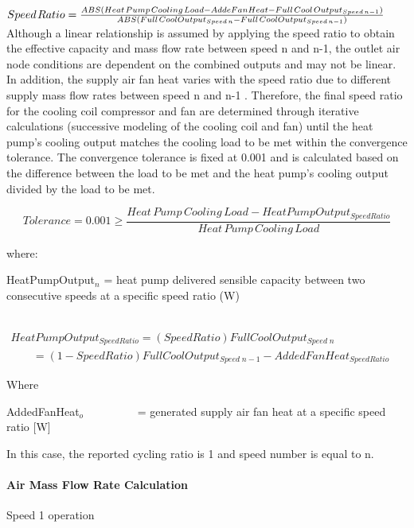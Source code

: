\(Speed{\kern 1pt} Ratio = \frac{{ABS(Heat{\kern 1pt} Pump{\kern 1pt} Cooling{\kern 1pt} Load - AddeFanHeat - Full{\kern 1pt} Cool{\kern 1pt} Outpu{t_{Speed{\kern 1pt} n - 1}})}}{{ABS(Full{\kern 1pt} CoolOutpu{t_{Speed{\kern 1pt} n}} - Full{\kern 1pt} CoolOutpu{t_{Speed{\kern 1pt} n - 1}})}}\) Although a linear relationship is assumed by applying the speed ratio to obtain the effective capacity and mass flow rate between speed n and n-1, the outlet air node conditions are dependent on the combined outputs and may not be linear. In addition, the supply air fan heat varies with the speed ratio due to different supply mass flow rates between speed n and n-1 . Therefore, the final speed ratio for the cooling coil compressor and fan are determined through iterative calculations (successive modeling of the cooling coil and fan) until the heat pump's cooling output matches the cooling load to be met within the convergence tolerance. The convergence tolerance is fixed at 0.001 and is calculated based on the difference between the load to be met and the heat pump's cooling output divided by the load to be met.

\begin{equation}
Tolerance = 0.001 \ge \frac{{Heat\,Pump\,Cooling\,Load - HeatPumpOutpu{t_{SpeedRatio}}}}{{Heat\,Pump\,Cooling\,Load}}
\end{equation}

where:

HeatPumpOutput\(_{n}\) = heat pump delivered sensible capacity between two consecutive speeds at a specific speed ratio (W)

~~~~~~ \(\begin{array}{l}HeatPumpOutpu{t_{SpeedRatio}} = (SpeedRatio)FullCoolOutpu{t_{Speed\;n}}\\\;\;\;\;\;\;\; = (1 - SpeedRatio)FullCoolOutpu{t_{Speed\;n - 1}} - AddedFanHea{t_{SpeedRatio}}\end{array}\)

Where

AddedFanHeat\(_{o}\)~~~~~~~~~ = generated supply air fan heat at a specific speed ratio {[}W{]}

In this case, the reported cycling ratio is 1 and speed number is equal to n.

\paragraph{Air Mass Flow Rate Calculation}\label{air-mass-flow-rate-calculation-2}

Speed 1 operation

